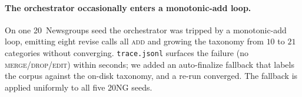 \paragraph{The orchestrator occasionally enters a monotonic-add loop.}
On one 20~Newsgroups seed the orchestrator was tripped by a
monotonic-add loop, emitting eight revise calls all \textsc{add} and
growing the taxonomy from $10$ to $21$ categories without converging.
\texttt{trace.jsonl} surfaces the failure (no
\textsc{merge}/\textsc{drop}/\textsc{edit}) within seconds; we added an
auto-finalize fallback that labels the corpus against the on-disk
taxonomy, and a re-run converged. The fallback is applied uniformly to
all five 20NG seeds.